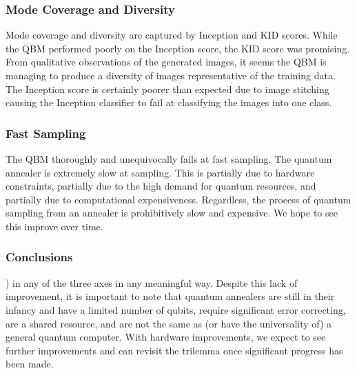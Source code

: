 \documentclass[technologies,article,accept,pdftex,moreauthors]{Definitions/mdpi}
\begin{document}
\subsubsection{Mode Coverage and Diversity}
Mode coverage and diversity are captured by Inception and KID scores. While the QBM performed poorly on the Inception score, the KID score was promising. From qualitative observations of the generated images, it seems the QBM is managing to produce a diversity of images representative of the training data. The Inception score is certainly poorer than expected due to image stitching causing the Inception classifier to fail at classifying the images into one class.

\subsubsection{Fast Sampling}
The QBM thoroughly and unequivocally fails at fast sampling. The quantum annealer is extremely slow at sampling. This is partially due to hardware constraints, partially due to the high demand for quantum resources, and partially due to computational expensiveness. Regardless, the process of quantum sampling from an annealer is prohibitively slow and expensive. We hope to see this improve over time.

\subsubsection{Conclusions}
) in any of the three axes in any meaningful way. Despite this lack of improvement, it is important to note that quantum annealers are still in their infancy and have a limited number of qubits, require significant error correcting, are a shared resource, and are not the same as (or have the universality of) a general quantum computer. With hardware improvements, we expect to see further improvements and can revisit the trilemma once significant progress has been made.
\end{document}

